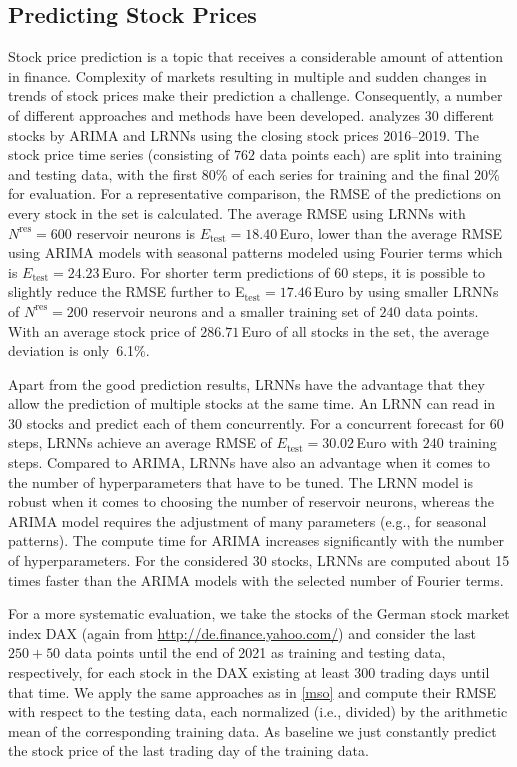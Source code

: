 \documentclass[twoside,11pt]{article}
\theoremstyle{definition}
\newcommand{\euro}{Euro}
\begin{document}
\subsection{Predicting Stock Prices}\label{stock}

Stock price prediction is a topic that receives a considerable amount of
attention in finance. Complexity of markets resulting in multiple and sudden
changes in trends of stock prices make their prediction a challenge.
Consequently, a number of different approaches and methods have been developed.
\citet{Lit20} analyzes $30$ different stocks by ARIMA and LRNNs using the
closing stock prices 2016--2019. The stock price time series (consisting of
$762$ data points each) are split into training and testing data, with the first
80\% of each series for training and the final 20\% for evaluation. For a
representative comparison, the RMSE of the predictions on every stock in the set
is calculated. The average RMSE using LRNNs with $N^\mathrm{res}=600$ reservoir
neurons is $E_\mathrm{test}=18.40${\,\euro}, lower than the average RMSE using
ARIMA models with seasonal patterns modeled using Fourier terms
\citep[p.~321]{HA13} which is $E_\mathrm{test}=24.23${\,\euro}. For shorter term
predictions of 60 steps, it is possible to slightly reduce the RMSE further to
E$_\mathrm{test}=17.46${\,\euro} by using smaller LRNNs of $N^\mathrm{res}=200$
reservoir neurons and a smaller training set of $240$ data points. With an
average stock price of $286.71${\,\euro} of all stocks in the set, the average
deviation is only~6.1\%.

Apart from the good prediction results, LRNNs have the advantage that they allow
the prediction of multiple stocks at the same time. An LRNN can read in 30
stocks and predict each of them concurrently. For a concurrent forecast for $60$
steps, LRNNs achieve an average RMSE of
$E_\mathrm{test}=30.02${\,\euro} with $240$ training steps. Compared to ARIMA,
LRNNs have also an advantage when it comes to the number of hyperparameters that
have to be tuned. The LRNN model is robust when it comes to choosing the number
of reservoir neurons, whereas the ARIMA model requires the adjustment of many
parameters (e.g., for seasonal patterns). The compute time for ARIMA increases
significantly with the number of hyperparameters. For the considered $30$
stocks, LRNNs are computed about 15 times faster than the ARIMA models with the
selected number of Fourier terms.

For a more systematic evaluation, we take the stocks of the German stock market
index DAX (again from \url{http://de.finance.yahoo.com/}) and consider the last
$250+50$ data points until the end of 2021 as training and testing data,
respectively, for each stock in the DAX existing at least $300$ trading days
until that time. We apply the same approaches as in \cref{mso} and compute their
RMSE with respect to the testing data, each normalized (i.e., divided) by the
arithmetic mean of the corresponding training data. As baseline we just
constantly predict the stock price of the last trading day of the training data.
\end{document}
